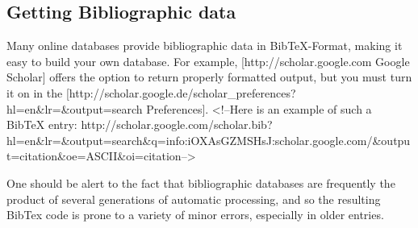 \subsection{Getting Bibliographic data}
Many online databases provide bibliographic data in BibTeX-Format, making it easy to build your own database.  
For example, [http://scholar.google.com Google Scholar] offers the option to
return properly formatted output, but you must turn it on in the
[http://scholar.google.de/scholar\_preferences?hl=en\&lr=\&output=search
Preferences]. <!--Here is an example of such a BibTeX entry:
http://scholar.google.com/scholar.bib?hl=en\&lr=\&output=search\&q=info:iOXAsGZMSHsJ:scholar.google.com/\&output=citation\&oe=ASCII\&oi=citation-->

One should be alert to the fact that bibliographic databases are frequently the
product of several generations of automatic processing, and so the resulting
BibTex code is prone to a variety of minor errors, especially in older entries.

